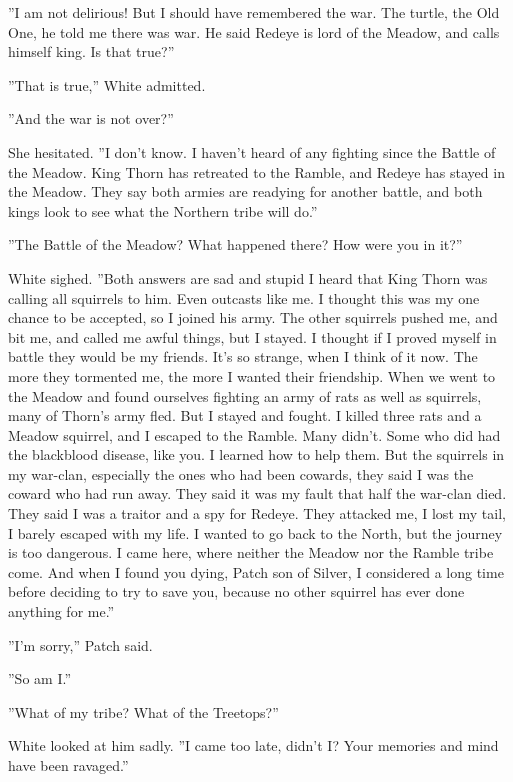 \documentclass[12pt]{book}
\begin{document}
 ''I am not delirious! But I should have remembered the war. The turtle, the Old One, he told me there was war. He said Redeye is lord of the Meadow, and calls himself king. Is that true?''\par
 ''That is true,'' White admitted.\par
 ''And the war is not over?''\par
 She hesitated. ''I don't know. I haven't heard of any fighting since the Battle of the Meadow. King Thorn has retreated to the Ramble, and Redeye has stayed in the Meadow. They say both armies are readying for another battle, and both kings look to see what the Northern tribe will do.''\par
 ''The Battle of the Meadow? What happened there? How were you in it?''\par
 White sighed. ''Both answers are sad and stupid %
 I heard that King Thorn was calling all squirrels to him. Even outcasts like me. I thought this was my one chance to be accepted, so I joined his army. The other squirrels pushed me, and bit me, and called me awful things, but I stayed. I thought if I proved myself in battle they would be my friends. It's so strange, when I think of it now. The more they tormented me, the more I wanted their friendship. When we went to the Meadow and found ourselves fighting an army of rats as well as squirrels, many of Thorn's army fled. But I stayed and fought. I killed three rats and a Meadow squirrel, and I escaped to the Ramble. Many didn't. Some who did had the blackblood disease, like you. I learned how to help them. But the squirrels in my war-clan, especially the ones who had been cowards, they said I was the coward who had run away. They said it was my fault that half the war-clan died. They said I was a traitor and a spy for Redeye. They attacked me, I lost my tail, I barely escaped with my life. I wanted to go back to the North, but the journey is too dangerous. I came here, where neither the Meadow nor the Ramble tribe come. And when I found you dying, Patch son of Silver, I considered a long time before deciding to try to save you, because no other squirrel has ever done anything for me.''\par
 ''I'm sorry,'' Patch said.\par
 ''So am I.''\par
 ''What of my tribe? What of the Treetops?''\par
 White looked at him sadly. ''I came too late, didn't I? Your memories and mind have been ravaged.''\par
\end{document}
